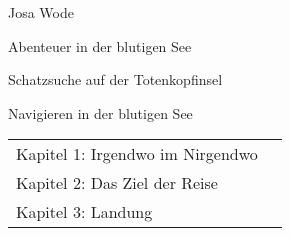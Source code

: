 \documentclass[fontsize=10pt,]{scrreprt}
\newcommand{\storytitle}{Abenteuer in der blutigen See}
\newcommand{\storysubtitle}{Schatzsuche auf der Totenkopfinsel}
\newcommand{\storyauthor}{Josa Wode}
\newcommand{\printtitle}{\begin{center}
{\large \storyauthor}

\vspace{0.6cm}
{\huge \storytitle}

\vspace{0.3cm}
{\large \storysubtitle}
\end{center}
}
\begin{document}
\thispagestyle{empty}

\printtitle
\thispagestyle{empty}

{\large

{\vspace{0.5cm}\noindent\LARGE Navigieren in der blutigen See}

\vspace{0.5cm}\noindent\begin{tabular}{lr}
Kapitel 1: Irgendwo im Nirgendwo & \pageref{0Kapitel 1: Irgendwo im Nirgendwo} \\
Kapitel 2: Das Ziel der Reise & \pageref{1Kapitel 2: Das Ziel der Reise} \\
Kapitel 3: Landung & \pageref{2Kapitel 3: Landung} \\
\end{tabular}
}

\vspace{0.5cm}



\noindent

\clearpage



\end{document}
